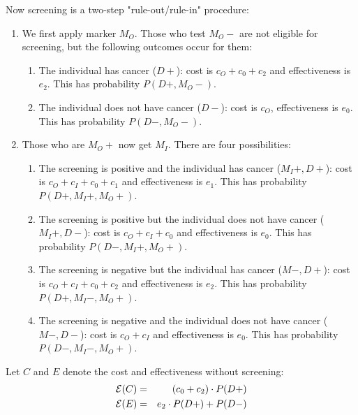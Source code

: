 \documentclass[11pt]{article}
\begin{document}
\noindent Now screening is a two-step "rule-out/rule-in" procedure:
\begin{enumerate}
	\item{We first apply marker $M_O$.  Those who test $M_O-$ are not eligible for screening, but the following outcomes occur for them:
		\begin{enumerate}
			\item{The individual has cancer ($D+$): cost is $c_O+c_0+c_2$ and effectiveness is $e_2$.  This has probability $P(D+,M_O-)$.}
			\item{The individual does not have cancer ($D-$): cost is $c_O$, effectiveness is $e_0$.  This has probability $P(D-,M_O-)$.}
	\end{enumerate}
	}
	\item{Those who are $M_O+$ now get $M_I$. There are four possibilities:
		\begin{enumerate}
			\item{The screening is positive and the individual has cancer ($M_I+,D+$): cost is $c_O+c_I+c_0+c_1$ and effectiveness is $e_1$.  This has probability $P(D+,M_I+,M_O+)$.}
			\item{The screening is positive but the individual does not have cancer ($M_I+,D-$): cost is $c_O+c_I+c_0$ and effectiveness is $e_0$.  This has probability $P(D-,M_I+,M_O+)$.}
			\item{The screening is negative but the individual has cancer ($M-,D+$): cost is $c_O+c_I+c_0+c_2$ and effectiveness is $e_2$.  This has probability $P(D+,M_I-,M_O+)$.}
			\item{The screening is negative and the individual does not have cancer ($M-,D-$): cost is $c_O+c_I$ and effectiveness is $e_0$.  This has probability $P(D-,M_I-,M_O+)$.}
		\end{enumerate}  
	}
\end{enumerate}

Let $C$ and $E$ denote the cost and effectiveness without screening:
\begin{eqnarray*}
	{\cal E} (C) &=& (c_0+c_2)\cdot P(D+) \\
	{\cal E} (E) &=& e_2\cdot P(D+) + P(D-)
\end{eqnarray*}
\end{document}
